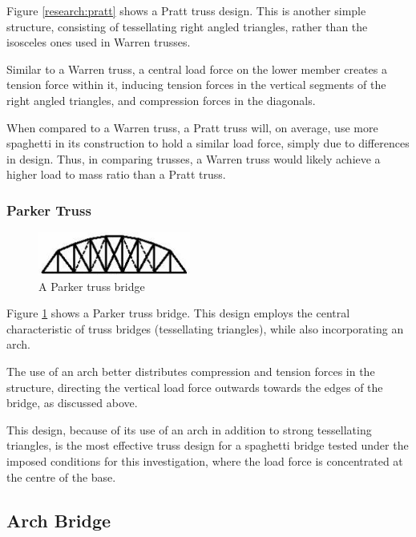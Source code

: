\documentclass[a4paper,11pt]{article}
\begin{document}
Figure \ref{research:pratt} shows a Pratt truss design.
This is another simple structure, consisting of tessellating right angled
triangles, rather than the isosceles ones used in Warren trusses.

Similar to a Warren truss, a central load force on the lower member creates a
tension force within it, inducing tension forces in the vertical segments of the
right angled triangles, and compression forces in the diagonals.

When compared to a Warren truss, a Pratt truss will, on average, use more
spaghetti in its construction to hold a similar load force, simply due to
differences in design.
Thus, in comparing trusses, a Warren truss would likely achieve a higher load to
mass ratio than a Pratt truss.


\subsubsection{Parker Truss}

\begin{figure}
\begin{center}
\includegraphics[width=5cm]{figures/parker.png}
\end{center}
\caption{A Parker truss bridge}
\label{research:parker}
\end{figure}

Figure \ref{research:parker} shows a Parker truss bridge.
This design employs the central characteristic of truss bridges (tessellating
triangles), while also incorporating an arch.

The use of an arch better distributes compression and tension forces in the
structure, directing the vertical load force outwards towards the edges of the
bridge, as discussed above.

This design, because of its use of an arch in addition to strong tessellating
triangles, is the most effective truss design for a spaghetti bridge tested
under the imposed conditions for this investigation, where the load force is
concentrated at the centre of the base.


\subsection{Arch Bridge}
\end{document}
